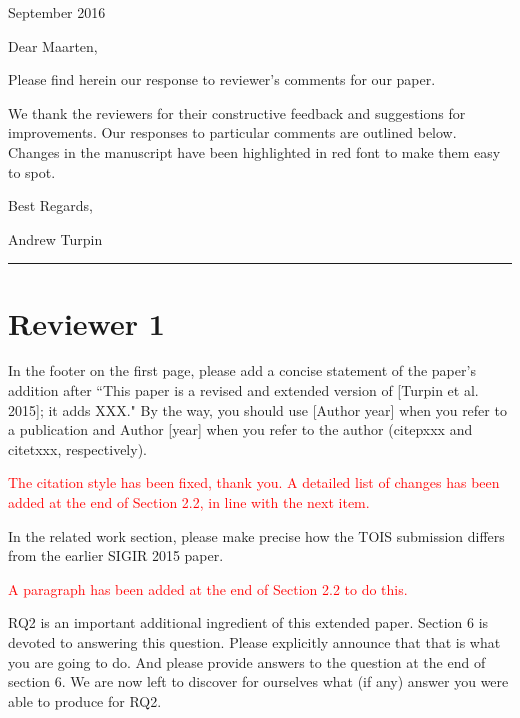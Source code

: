 \documentclass[a4paper]{article}
\newcommand{\comment}[1]{\vspace{1em} \textcolor{red}{{#1}} \vspace{1em}}
\begin{document}
\vspace{1em}
\vspace{1em}

 September 2016
\vspace{1em}

\noindent Dear Maarten,
\vspace{1em}

\noindent Please find herein our response to reviewer's comments 
for our paper.

\vspace{1em}

\noindent We thank the reviewers for their constructive feedback and suggestions
for improvements.
Our responses to particular comments are outlined below.
Changes in the manuscript have been highlighted in red font to make
them easy to spot.

\vspace{1em}

\noindent Best Regards,

\vspace{1em}
\noindent Andrew Turpin
\vspace{1em}
\vspace{1em}

\hrule
\vspace{1em}
\vspace{1em}




\section{Reviewer 1}

In the footer on the first page, please add a concise statement of
the paper's addition after ``This paper is a revised and extended
version of [Turpin et al. 2015]; it adds XXX." By the way, you
should use [Author year] when you refer to a publication and Author
[year] when you refer to the author (citep{xxx} and citet{xxx},
respectively).

\comment{The citation style has been fixed, thank you. A detailed list of changes has
been added at the end of  Section 2.2, in line with the next
item.}

In the related work section, please make precise how the TOIS
submission differs from the earlier SIGIR 2015 paper.

\comment{A paragraph has been added at the end of Section 2.2 to do this.}

RQ2 is an important additional ingredient of this extended paper.
Section 6 is devoted to answering this question. Please explicitly
announce that that is what you are going to do. And please provide
answers to the question at the end of section 6. We are now left
to discover for ourselves what (if any) answer you were able to
produce for RQ2.
\end{document}
